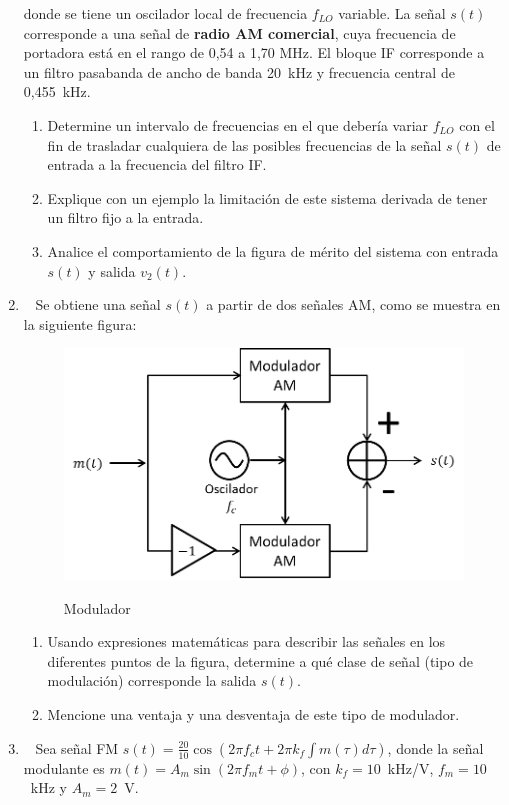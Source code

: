 \begin{enumerate}
donde se tiene un oscilador local de frecuencia $f_{LO}$ variable. La señal $s(t)$ corresponde a una señal de \textbf{{radio AM comercial}}, cuya frecuencia de portadora está en el rango de 0,54 a 1,70 MHz. El bloque IF corresponde a un filtro pasabanda de ancho de banda 20~kHz y frecuencia central de 0,455~kHz. 
\begin{enumerate}
	\item Determine un intervalo de frecuencias en el que debería variar $f_{LO}$ con el fin de trasladar cualquiera de las posibles frecuencias de la señal $s(t)$ de entrada a la frecuencia del filtro IF. 
	\item Explique con un ejemplo la limitación de este sistema derivada de tener un filtro fijo a la entrada. 
	\item  Analice el comportamiento de la figura de mérito del sistema con entrada $s(t)$ y salida $v_2(t)$.
\end{enumerate}

\item~ Se obtiene una señal $s(t)$ a partir de dos señales AM, como se muestra en la siguiente figura:

\begin{figure}[h!]
	\captionsetup{justification = raggedright, singlelinecheck = false}
	\caption{Modulador} 
	\centering
	\includegraphics[scale=0.65]{Imagenes/2014ESQUEMA.png}
	\label{fig:2014ESQUEMA}
\end{figure}



\begin{enumerate}
	\item Usando expresiones matemáticas para describir las señales en los diferentes puntos de la figura, determine a qué clase de señal (tipo de modulación) corresponde la salida $s(t)$.
	\item Mencione una ventaja y una desventaja de este tipo de modulador.
\end{enumerate}
\item~ Sea señal FM $s(t) = \frac{20}{10}\cos(2\pi f_c t+2\pi k_f \int{m(\tau)d\tau})$, donde la señal modulante es $m(t)=A_m \sin(2\pi f_m t + \phi)$, con $k_f=10$~kHz/V, $f_m=	10$~kHz y $A_m = 2$~V.


\end{enumerate}
